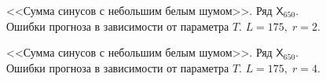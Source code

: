 \documentclass[specialist,
               substylefile = spbu.rtx,
               subf,href,colorlinks=true, 12p]{disser}
\begin{document}
\begin{figure}[H]
	\captionsetup{justification=centering}
	\caption{<<Сумма синусов с небольшим белым шумом>>. Ряд $\mathsf{X}_{650}$. Ошибки прогноза в зависимости от параметра $T$. $L = 175, \; r = 2$.}
	\label{edsin0.3r_r2}
\end{figure}

\begin{figure}[H]
	\captionsetup{justification=centering}
	\caption{<<Сумма синусов с небольшим белым шумом>>. Ряд $\mathsf{X}_{650}$. Ошибки прогноза в зависимости от параметра $T$. $L = 175, \; r = 4$.}
	\label{edsin0.3r_r4}
\end{figure}
\end{document}

